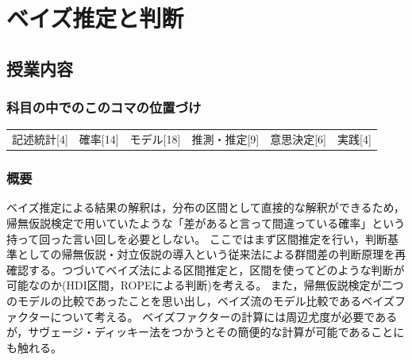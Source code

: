 \section{ベイズ推定と判断}
\label{D1_lesson27}

\subsection{授業内容}
\subsubsection{科目の中でのこのコマの位置づけ}
\begin{tabular}[t]{cccccc}
    記述統計[4] & 確率[14] & モデル[18] & 推測・推定[9] & 意思決定[6] & 実践[4]
\end{tabular}

\subsubsection{概要}
ベイズ推定による結果の解釈は，分布の区間として直接的な解釈ができるため，帰無仮説検定で用いていたような「差があると言って間違っている確率」という持って回った言い回しを必要としない。
ここではまず区間推定を行い，判断基準としての帰無仮説・対立仮説の導入という従来法による群間差の判断原理を再確認する。つづいてベイズ法による区間推定と，区間を使ってどのような判断が可能なのか(HDI区間，ROPEによる判断)を考える。
また，帰無仮説検定が二つのモデルの比較であったことを思い出し，ベイズ流のモデル比較であるベイズファクターについて考える。
ベイズファクターの計算には周辺尤度が必要であるが，サヴェージ・ディッキー法をつかうとその簡便的な計算が可能であることにも触れる。

